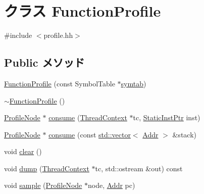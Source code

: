 \hypertarget{classFunctionProfile}{
\section{クラス FunctionProfile}
\label{classFunctionProfile}
}


{\ttfamily \#include $<$profile.hh$>$}\subsection*{Public メソッド}
\begin{DoxyCompactItemize}
\item 
\hyperlink{classFunctionProfile_a86b4c0d5aba6c081cfe3e83cf5875013}{FunctionProfile} (const SymbolTable $\ast$\hyperlink{classFunctionProfile_afc2455c41183c75b789c6f4135d13eb5}{symtab})
\item 
\hyperlink{classFunctionProfile_a088d30b266fc763d990ad210389c4dc9}{$\sim$FunctionProfile} ()
\item 
\hyperlink{classProfileNode}{ProfileNode} $\ast$ \hyperlink{classFunctionProfile_a597d46ad07c398ed586cf6ac26a2249c}{consume} (\hyperlink{classThreadContext}{ThreadContext} $\ast$tc, \hyperlink{classRefCountingPtr}{StaticInstPtr} inst)
\item 
\hyperlink{classProfileNode}{ProfileNode} $\ast$ \hyperlink{classFunctionProfile_a433766abe1b9e7377fe0e1be439b4794}{consume} (const \hyperlink{classstd_1_1vector}{std::vector}$<$ \hyperlink{base_2types_8hh_af1bb03d6a4ee096394a6749f0a169232}{Addr} $>$ \&stack)
\item 
void \hyperlink{classFunctionProfile_ac8bb3912a3ce86b15842e79d0b421204}{clear} ()
\item 
void \hyperlink{classFunctionProfile_a66ed13eccc3001d33ef51ab3852837e9}{dump} (\hyperlink{classThreadContext}{ThreadContext} $\ast$tc, std::ostream \&out) const 
\item 
void \hyperlink{classFunctionProfile_a89e8cc61802d8d3f9959e2e198196158}{sample} (\hyperlink{classProfileNode}{ProfileNode} $\ast$node, \hyperlink{base_2types_8hh_af1bb03d6a4ee096394a6749f0a169232}{Addr} pc)
\end{DoxyCompactItemize}
